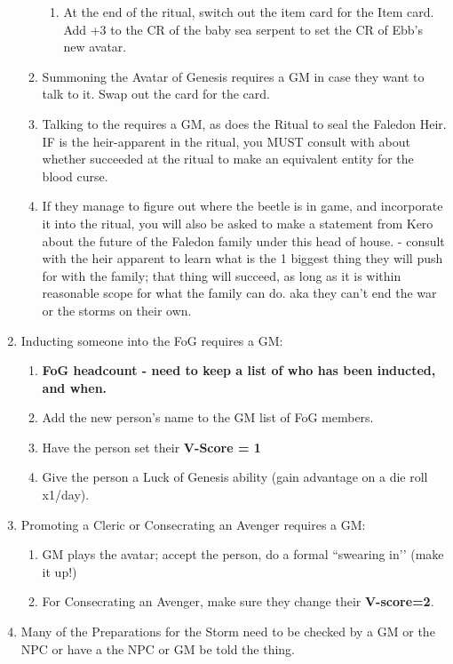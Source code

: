 \documentclass[green]{GL2020}
\begin{document}
\begin{enumerate}
\begin{enumerate}
\begin{enumerate}
			\item At the end of the ritual, switch out the \iBabySeaSerpent{} item card for the \iAvatarSeaSerpent{} Item card. Add +3 to the CR of the baby sea serpent to set the CR of Ebb’s new avatar.
		\end{enumerate}
		\item Summoning the Avatar of Genesis requires a GM in case they want to talk to it. Swap out the \iRabbitStatue{} card for the \iAvatarRabbit{} card.
		\item Talking to the \iAvatarBeetle{} requires a GM, as does the Ritual to seal the Faledon Heir. IF \cAmbition{} is the heir-apparent in the ritual, you MUST consult with \cHeir{} about whether \cHeir{\they} succeeded at the ritual to make \cAmbition{} an equivalent entity for the blood curse. 
\item If they manage to figure out where the beetle is in game, and incorporate it into the ritual, you will also be asked to make a statement from Kero about the future of the Faledon family under this head of house. - consult with the heir apparent to learn what is the 1 biggest thing they will push for with the family; that thing will succeed, as long as it is within reasonable scope for what the family can do. aka they can’t end the war or the storms on their own.
	\end{enumerate}
	\item Inducting someone into the FoG requires a GM: 
	\begin{enumerate}
		\item \textbf{FoG headcount - need to keep a list of who has been inducted, and when.}
		\item Add the new person’s name to the GM list of FoG members.
		\item Have the person set their \textbf{V-Score = 1}
\item Give the person a Luck of Genesis ability (gain advantage on a die roll x1/day).
	\end{enumerate}
	\item Promoting a Cleric or Consecrating an Avenger requires a GM:
	\begin{enumerate}
		\item GM plays the avatar; accept the person, do a formal ``swearing in’’ (make it up!)
		\item For Consecrating an Avenger, make sure they change their \textbf{V-score=2}.
	\end{enumerate}
	\item Many of the Preparations for the Storm need to be checked by a GM or the NPC or have a the NPC or GM be told the thing.

\end{enumerate}
\end{document}
